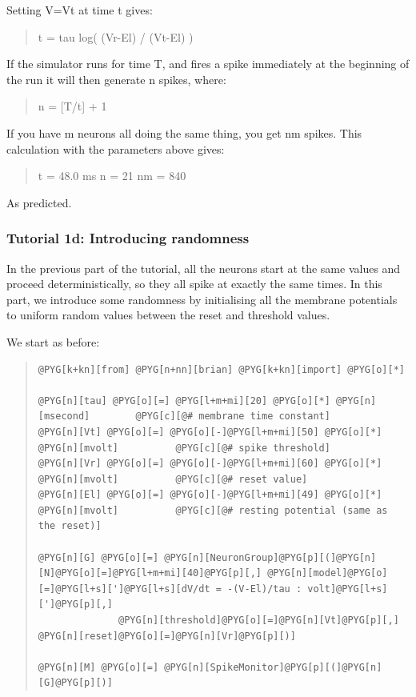 \documentclass[letterpaper,10pt,english]{manual}
\begin{document}
Setting V=Vt at time t gives:
\begin{quote}

t = tau log( (Vr-El) / (Vt-El) )
\end{quote}

If the simulator runs for time T, and fires a spike immediately
at the beginning of the run it will then generate n spikes,
where:
\begin{quote}

n = {[}T/t{]} + 1
\end{quote}

If you have m neurons all doing the same thing, you get nm
spikes. This calculation with the parameters above gives:
\begin{quote}

t = 48.0 ms
n = 21
nm = 840
\end{quote}

As predicted.

\resetcurrentobjects
\hypertarget{--doc-tutorial_1d_introducing_randomness}{}

\subsubsection{Tutorial 1d: Introducing randomness}

In the previous part of the tutorial, all the neurons start
at the same values and proceed deterministically, so they all
spike at exactly the same times. In this part, we introduce
some randomness by initialising all the membrane potentials
to uniform random values between the reset and threshold
values.

We start as before:
\begin{quote}

\begin{Verbatim}[commandchars=@\[\]]
@PYG[k+kn][from] @PYG[n+nn][brian] @PYG[k+kn][import] @PYG[o][*]

@PYG[n][tau] @PYG[o][=] @PYG[l+m+mi][20] @PYG[o][*] @PYG[n][msecond]        @PYG[c][@# membrane time constant]
@PYG[n][Vt] @PYG[o][=] @PYG[o][-]@PYG[l+m+mi][50] @PYG[o][*] @PYG[n][mvolt]          @PYG[c][@# spike threshold]
@PYG[n][Vr] @PYG[o][=] @PYG[o][-]@PYG[l+m+mi][60] @PYG[o][*] @PYG[n][mvolt]          @PYG[c][@# reset value]
@PYG[n][El] @PYG[o][=] @PYG[o][-]@PYG[l+m+mi][49] @PYG[o][*] @PYG[n][mvolt]          @PYG[c][@# resting potential (same as the reset)]

@PYG[n][G] @PYG[o][=] @PYG[n][NeuronGroup]@PYG[p][(]@PYG[n][N]@PYG[o][=]@PYG[l+m+mi][40]@PYG[p][,] @PYG[n][model]@PYG[o][=]@PYG[l+s][']@PYG[l+s][dV/dt = -(V-El)/tau : volt]@PYG[l+s][']@PYG[p][,]
              @PYG[n][threshold]@PYG[o][=]@PYG[n][Vt]@PYG[p][,] @PYG[n][reset]@PYG[o][=]@PYG[n][Vr]@PYG[p][)]

@PYG[n][M] @PYG[o][=] @PYG[n][SpikeMonitor]@PYG[p][(]@PYG[n][G]@PYG[p][)]
\end{Verbatim}
\end{quote}
\end{document}
